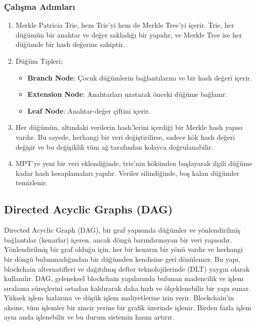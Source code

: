 \subsubsection{Çalışma Adımları}

\begin{enumerate}
    \item Merkle Patricia Trie, hem Trie'yi hem de Merkle Tree'yi içerir. Trie, her düğümün bir anahtar ve değer sakladığı bir yapıdır, ve Merkle Tree ise her düğümde bir hash değerine sahiptir.
    \item Düğüm Tipleri;
    \begin{itemize}
        \item \textbf{Branch Node}: Çocuk düğümlerin bağlantılarını ve bir hash değeri içerir.
        \item \textbf{Extension Node}: Anahtarları uzatarak önceki düğüme bağlanır.
        \item \textbf{Leaf Node}: Anahtar-değer çiftini içerir.
    \end{itemize}
    \item Her düğümün, altındaki verilerin hash'lerini içerdiği bir Merkle hash yapısı vardır. Bu sayede, herhangi bir veri değiştirilirse, sadece kök hash değeri değişir ve bu değişiklik tüm ağ tarafından kolayca doğrulanabilir.
    \item MPT'ye yeni bir veri eklendiğinde, trie'nin kökünden başlayarak ilgili düğüme kadar hash hesaplamaları yapılır. Veriler silindiğinde, boş kalan düğümler temizlenir.
\end{enumerate}

\newpage

\subsection{Directed Acyclic Graphs (DAG)}

Directed Acyclic Graph (DAG), bir graf yapısında düğümler ve yönlendirilmiş bağlantılar (kenarlar) içeren, ancak döngü barındırmayan bir veri yapısıdır. Yönlendirilmiş bir graf olduğu için, her bir kenarın bir yönü vardır ve herhangi bir döngü bulunmadığından bir düğümden kendisine geri dönülemez. Bu yapı, blockchain alternatifleri ve dağıtılmış defter teknolojilerinde (DLT) yaygın olarak kullanılır. DAG, geleneksel blockchain yapılarında bulunan madencilik ve işlem sıralama süreçlerini ortadan kaldırarak daha hızlı ve ölçeklenebilir bir yapı sunar. Yüksek işlem hızlarına ve düşük işlem maliyetlerine izin verir. Blockchain'in aksine, tüm işlemler bir zincir yerine bir grafik üzerinde işlenir. Birden fazla işlem aynı anda işlenebilir ve bu durum sistemin hızını artırır.

